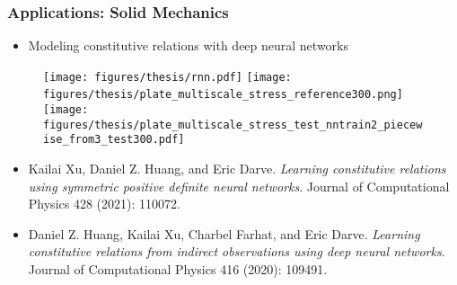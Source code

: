 \documentclass[usenames,dvipsnames]{beamer}
\begin{document}
\begin{frame}
	\frametitle{Applications: Solid Mechanics}
	\begin{itemize}
\item Modeling constitutive relations with deep neural networks

	\end{itemize}
		\begin{figure}[hbt]
		\centering
		\texttt{[image: figures/thesis/rnn.pdf]}
	\texttt{[image: figures/thesis/plate\_multiscale\_stress\_reference300.png]}~
	\texttt{[image: figures/thesis/plate\_multiscale\_stress\_test\_nntrain2\_piecewise\_from3\_test300.pdf]}
		\end{figure}
			
			\vspace{-0.2cm}
		{
			\tiny
			
			\begin{itemize}
				\item[] Kailai Xu, Daniel Z. Huang, and Eric Darve. \textit{Learning constitutive relations using symmetric positive definite neural networks}. Journal of Computational Physics 428 (2021): 110072.
				\item[] Daniel Z. Huang, Kailai Xu, Charbel Farhat, and Eric Darve. \textit{Learning constitutive relations from indirect observations using deep neural networks}. Journal of Computational Physics 416 (2020): 109491.
			\end{itemize}
			
			
			
		}
\end{frame}
\end{document}
